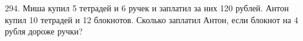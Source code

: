 294. Миша купил 5 тетрадей и 6 ручек и заплатил за них 120 рублей. Антон купил 10 тетрадей и 12 блокнотов. Сколько заплатил Антон, если блокнот на 4 рубля дороже ручки?\\

